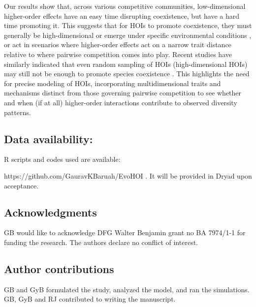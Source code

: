 \documentclass[11pt]{article}
\begin{document}
Our results show that, across various competitive communities, low-dimensional higher-order effects have an easy time disrupting coexistence, but have a hard time promoting it. This suggests that for HOIs to promote coexistence, they must generally be high-dimensional or emerge under specific environmental conditions \citep{fox_existence_2023}, or act in scenarios where higher-order effects act on a narrow trait distance relative to where pairwise competition comes into play. Recent studies have similarly indicated that even random sampling of HOIs (high-dimensional HOIs) may still not be enough to promote species coexistence \citep{gibbs_when_2024}. This highlights the need for precise modeling of HOIs, incorporating multidimensional traits and mechanisms distinct from those governing pairwise competition to see whether and when (if at all) higher-order interactions contribute to observed diversity patterns.


\subsection*{Data availability:} 
R scripts and codes used are available: 

https://github.com/GauravKBaruah/EvoHOI . It will be provided in Dryad upon acceptance.
\subsection*{Acknowledgments}
GB would like to acknowledge DFG Walter Benjamin grant no BA 7974/1-1 for funding the research. The authors declare no conflict of interest.

\subsection*{Author contributions}
GB and GyB formulated the study, analyzed the model, and ran the simulations. GB, GyB and RJ contributed to writing the manuscript.
\end{document}
